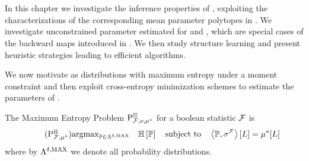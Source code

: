 \chapter{\chatextnetworkReasoning}\label{cha:networkReasoning}

In this chapter we investigate the inference properties of \HybridLogicNetworks{}, exploiting the characterizations of the corresponding mean parameter polytopes in .
We investigate unconstrained parameter estimated for \MarkovLogicNetworks{} and \HybridLogicNetworks{}, which are special cases of the backward maps introduced in .
We then study structure learning and present heuristic strategies leading to efficient algorithms.


We now motivate \HybridLogicNetworks{} as distributions with maximum entropy under a moment constraint and then exploit cross-entropy minimization schemes to estimate the parameters of \HybridLogicNetworks{}.


The Maximum Entropy Problem $\mathrm{P}^{\mathbb{H}}_{\mathcal{F},\nu,\mu^*}$ for a boolean statistic $\mathcal{F}$ is %
\begin{align}
    \label{prob:maxEntropyHLN}\tag{$\probtagtypeinst{\entropysymbol}{\hlnstat,\genmean}$}
    \argmax_{\probtensor\in\alldists} \quad \sentropyof{\probtensor}
    \stspace
    \contractionof{\probtensor,\sencmlnstat}{\selvariable}
    =  \genmeanwith
\end{align}
where by $\Lambda^{\delta,\mathrm{MAX}}$ we denote all probability distributions.

